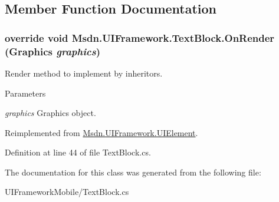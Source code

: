 \subsection{Member Function Documentation}
\hypertarget{class_msdn_1_1_u_i_framework_1_1_text_block_a64a6a9fdda4cfe9c5781d1c54ce3da84}{
\subsubsection[{OnRender}]{\setlength{\rightskip}{0pt plus 5cm}override void Msdn.UIFramework.TextBlock.OnRender (Graphics {\em graphics})}}
\label{class_msdn_1_1_u_i_framework_1_1_text_block_a64a6a9fdda4cfe9c5781d1c54ce3da84}


Render method to implement by inheritors. 
\begin{DoxyParams}{Parameters}
\item[{\em graphics}]Graphics object.\end{DoxyParams}


Reimplemented from \hyperlink{class_msdn_1_1_u_i_framework_1_1_u_i_element_a20b2245806231553935896fe7731812b}{Msdn.UIFramework.UIElement}.

Definition at line 44 of file TextBlock.cs.

The documentation for this class was generated from the following file:\begin{DoxyCompactItemize}
\item 
UIFrameworkMobile/TextBlock.cs\end{DoxyCompactItemize}
